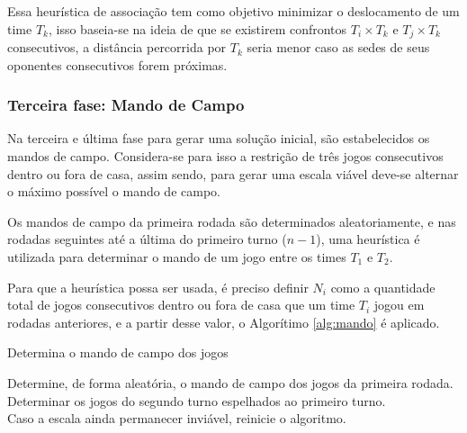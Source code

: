 \documentclass[12pt,a4paper]{article}
\makeatletter
\newcommand{\algorithmfootnote}[2][\footnotesize]{%
	\let\old@algocf@finish\@algocf@finish%
	\def\@algocf@finish{\old@algocf@finish%
		\leavevmode\rlap{\begin{minipage}{\linewidth}
				#1#2
		\end{minipage}}%
	}%
}
\numberwithin{figure}{section}
\numberwithin{table}{section}
\makeatother
\begin{document}
Essa heurística de associação tem como objetivo minimizar o deslocamento de um time $T_{k}$, isso baseia-se na ideia de que se existirem confrontos $T_{i} \times T_{k}$ e $T_{j} \times T_{k}$ consecutivos, a distância percorrida por $T_{k}$ seria menor caso as sedes de seus oponentes consecutivos forem próximas.

\subsubsection{Terceira fase: Mando de Campo}

Na terceira e última fase para gerar uma solução inicial, são estabelecidos os mandos de campo. Considera-se para isso a restrição de três jogos consecutivos dentro ou fora de casa, assim sendo, para gerar uma escala viável deve-se alternar o máximo possível o mando de campo.

Os mandos de campo da primeira rodada são determinados aleatoriamente, e nas rodadas seguintes até a última do primeiro turno ($n-1$), uma heurística é utilizada para determinar o mando de um jogo entre os times $T_{1}$ e $T_{2}$.

Para que a heurística possa ser usada, é preciso definir $N_{i}$ como a quantidade total de jogos consecutivos dentro ou fora de casa que um time $T_{i}$ jogou em rodadas anteriores, e a partir desse valor, o Algorítimo \ref{alg:mando} é aplicado.

\vspace{0.5cm}
\begin{algorithm}[H]
	\caption{Determina o mando de campo dos jogos}
	\algorithmfootnote{Fonte: \citet*{marcio:jogos}}
	\label{alg:mando}
	Determine, de forma aleatória, o mando de campo dos jogos da primeira rodada.\\
	Determinar os jogos do segundo turno espelhados ao primeiro turno.\\
	Caso a escala ainda permanecer inviável, reinicie o algoritmo.
\end{algorithm}
\vspace{0.5cm}
\end{document}

